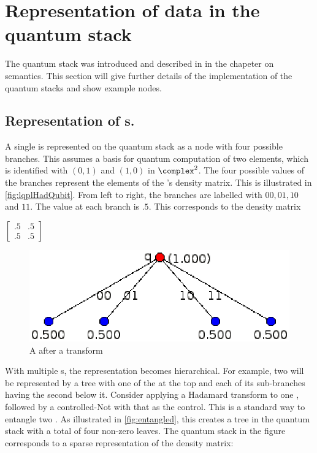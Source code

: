 \section{Representation of data in the quantum stack}\label{subsec:representationofqstackdata}

The quantum stack was introduced and described in \cite{giles:msc2} in the chapeter on semantics.
 This
section will give further details of the implementation of the quantum
stacks and show example nodes.

\subsection{Representation of \qubit{}s.}\label{subsec:representationOfQubits}
A single \qubit{} is represented on the quantum stack as a  node with
four possible branches. This assumes a basis for quantum computation
of two elements, which is identified with $(0,1)$ and $(1,0)$ in 
 $\complex^2$. The four possible values of the branches represent
the elements of the \qubit{}'s density matrix. This is illustrated in
\vref{fig:lqplHadQubit}. From left to right, the branches are labelled with
$00, 01, 10$ and $11$. The value at each branch is $.5$. This 
corresponds to the density matrix {\begin{singlespace}
$\begin{bmatrix}.5&.5\\.5&.5\end{bmatrix}$\end{singlespace}
}

\begin{figure}[htbp]
\centerline{
\includegraphics[scale=.6]{images/HadQubit.eps}
}
\caption{A \qubit{} after a \Had{} transform}\label{fig:lqplHadQubit}
\end{figure}

With multiple \qubit{}s,  the representation becomes hierarchical.
For example, two  will be represented by a tree with one of the
\qubits{} at the top and each of its sub-branches
 having the second \qubit{} below it. 
Consider applying a Hadamard transform to one \qubit, followed by a 
controlled-Not with that \qubit{} as the control. This is 
a standard way to entangle two \qubits. As illustrated in
\vref{fig:entangled}, this creates a tree in the quantum stack with
a total of four non-zero leaves. The quantum stack in the figure
corresponds to a sparse representation of the density matrix:

